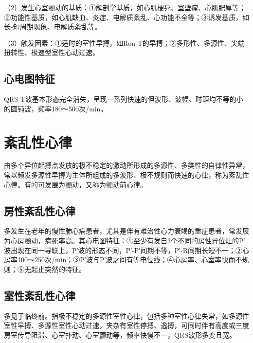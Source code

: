 （2）发生心室颤动的基质：①解剖学基质，如心肌梗死、室壁瘤、心肌肥厚等；②功能性基质，如心肌缺血、炎症、电解质紊乱、心功能不全等；③诱发基质，如长-短周期现象、电解质紊乱等。

（3）触发因素：①适时的室性早搏，如Ron-T的早搏；②多形性、多源性、尖端扭转性、极速型室性心动过速。

\protect\hypertarget{text00020.htmlux5cux23subid219}{}{}

\subsection{心电图特征}

QRS-T波基本形态完全消失，呈现一系列快速的但波形、波幅、时距均不等的小的圆钝波，频率180～500次/min。

\protect\hypertarget{text00020.htmlux5cux23subid220}{}{}

\section{紊乱性心律}

由多个异位起搏点发放的极不稳定的激动所形成的多源性、多类性的自律性异常，常以频发多源性早搏为主体所组成的多波形、极不规则而快速的心律，称为紊乱性心律。有的可发展为颤动，又称为颤动前心律。

\protect\hypertarget{text00020.htmlux5cux23subid221}{}{}

\subsection{房性紊乱性心律}

多发生在老年的慢性肺心病患者，尤其是伴有难治性心力衰竭的重症患者，常发展为心房颤动，病死率高。其心电图特征：①至少有发自3个不同的房性异位灶的P′波出现在同一导联上，P′波的形态不同，P′-P′间期不等，P′-R间期长短不一；②心房率100～250次/min；③P′波与P′波之间有等电位线；④心房率、心室率快而不规则；⑤无起止突然的特征。

\protect\hypertarget{text00020.htmlux5cux23subid222}{}{}

\subsection{室性紊乱性心律}

多见于临终前。指极不稳定的多源性室性心律，包括多种室性心律失常，如多源性室性早搏、多源性室性心动过速，夹杂有室性停搏、逸搏，可同时伴有高度或三度房室传导阻滞、心室扑动、心室颤动等，频率快慢不一，QRS波形多变且宽。


